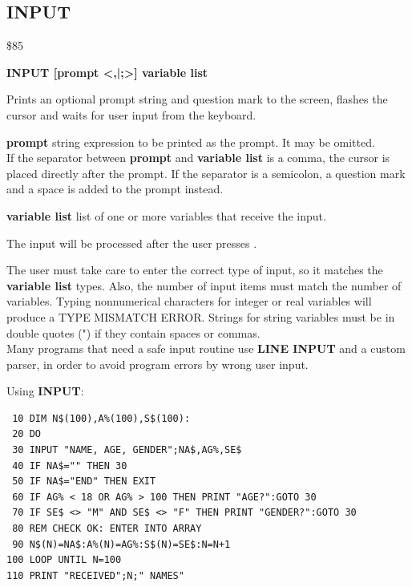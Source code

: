 \newpage
\subsection{INPUT}
\begin{description}[leftmargin=2cm,style=nextline]
\item [Token:] \$85
\item [Format:] {\bf INPUT [prompt <,|;>] variable list}
\item [Usage:] Prints an optional
               prompt string and question mark to the screen,
               flashes the cursor and waits for user input
               from the keyboard.

               {\bf prompt} string expression to be printed
               as the prompt. It may be omitted. \\
               If the separator between {\bf prompt} and {\bf variable list}
               is a comma, the cursor is placed directly after
               the prompt. If the separator is a semicolon,
               a question mark and a space is added to the prompt instead.

               {\bf variable list} list of one or more
               variables that receive the input.

               The input will be processed after the user presses .

\item [Remarks:] The user must take care to enter the correct
               type of input, so it matches the {\bf variable list} types.
               Also, the number of input items must match the number
               of variables.
               Typing nonnumerical characters for integer or real
               variables will produce a TYPE MISMATCH ERROR.
               Strings for string variables must be in double quotes (")
               if they contain spaces or commas. \\
               Many programs that need a safe input routine use
               {\bf LINE INPUT} and a custom parser, in order
               to avoid program errors by wrong user input.

\item [Example:] Using {\bf INPUT}:
\begin{tcolorbox}[colback=black,coltext=white]
\verbatimfont{\codefont}
\begin{verbatim}
 10 DIM N$(100),A%(100),S$(100):
 20 DO
 30 INPUT "NAME, AGE, GENDER";NA$,AG%,SE$
 40 IF NA$="" THEN 30
 50 IF NA$="END" THEN EXIT
 60 IF AG% < 18 OR AG% > 100 THEN PRINT "AGE?":GOTO 30
 70 IF SE$ <> "M" AND SE$ <> "F" THEN PRINT "GENDER?":GOTO 30
 80 REM CHECK OK: ENTER INTO ARRAY
 90 N$(N)=NA$:A%(N)=AG%:S$(N)=SE$:N=N+1
100 LOOP UNTIL N=100
110 PRINT "RECEIVED";N;" NAMES"
\end{verbatim}
\end{tcolorbox}
\end{description}

